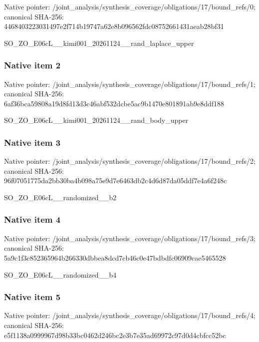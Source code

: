 \documentclass[10pt,a4paper]{article}
\begin{document}
Native pointer: /joint\_analysis/synthesi\allowbreak{}s\_coverage/obligations/1\allowbreak{}7/bound\_refs/0; canonical SHA-256: 4468403223031497e2f714b1\allowbreak{}9747a62e8b096562fdc08752\allowbreak{}661431aeab28bf31


SO\_ZO\_E06cL\_\_kimi001\_202\allowbreak{}61124\_\_rand\_laplace\_uppe\allowbreak{}r


\subsubsection{Native item 2}


Native pointer: /joint\_analysis/synthesi\allowbreak{}s\_coverage/obligations/1\allowbreak{}7/bound\_refs/1; canonical SHA-256: 6af36bca59808a19d8fd13d3\allowbreak{}c46abf532dcbe5ac9b1470e8\allowbreak{}01891ab9e8ddf188


SO\_ZO\_E06cL\_\_kimi001\_202\allowbreak{}61124\_\_rand\_body\_upper


\subsubsection{Native item 3}


Native pointer: /joint\_analysis/synthesi\allowbreak{}s\_coverage/obligations/1\allowbreak{}7/bound\_refs/2; canonical SHA-256: 96f07051775da2bb30ba4b09\allowbreak{}8a75e9d7e6463db2c4d6d87d\allowbreak{}a05ddf7e4a6f248c


SO\_ZO\_E06cL\_\_randomized\_\_b2


\subsubsection{Native item 4}


Native pointer: /joint\_analysis/synthesi\allowbreak{}s\_coverage/obligations/1\allowbreak{}7/bound\_refs/3; canonical SHA-256: 5a9c1f3c852365964b266330\allowbreak{}dbbea8dcd7cb46c0e47bdbdf\allowbreak{}c06909cae5465528


SO\_ZO\_E06cL\_\_randomized\_\_b4


\subsubsection{Native item 5}


Native pointer: /joint\_analysis/synthesi\allowbreak{}s\_coverage/obligations/1\allowbreak{}7/bound\_refs/4; canonical SHA-256: e5f1138a0999967d98b33bc0\allowbreak{}462d246bc2e3b7e35ad69972\allowbreak{}c97d0d4cbfcc52bc
\end{document}
